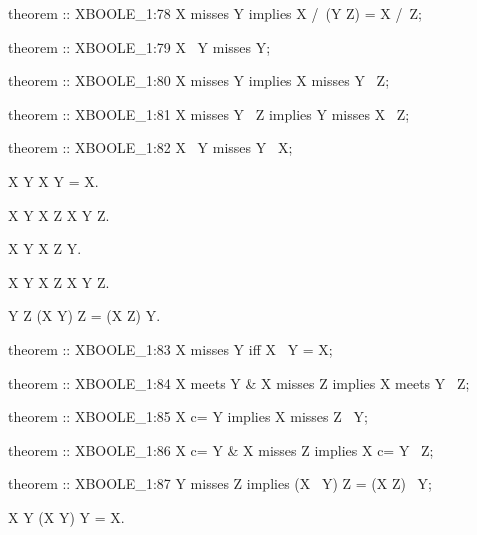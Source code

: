 \begin{paracol}{2}
\switchcolumn

\begin{mizar}
theorem :: XBOOLE_1:78
  X misses Y implies X /\ (Y \/ Z) = X /\ Z;

theorem :: XBOOLE_1:79
  X \ Y misses Y;

theorem :: XBOOLE_1:80
  X misses Y implies X misses Y \ Z;

theorem :: XBOOLE_1:81
  X misses Y \ Z implies Y misses X \ Z;

theorem :: XBOOLE_1:82
  X \ Y misses Y \ X;
\end{mizar}

\switchcolumn*\ensurevspace{5cm}

\begin{theorem}
  X \misses Y \iff X \setminus Y = X.
\end{theorem}

\begin{theorem}
  X \meets Y \land X \misses Z \implies X \meets Y \setminus Z.
\end{theorem}

\begin{theorem}
  X \subset Y \implies X \misses Z \setminus Y.
\end{theorem}

\begin{theorem}
  X \subset Y \land X \misses Z \implies X \subset Y \setminus Z.
\end{theorem}

\begin{theorem}
  Y \misses Z \implies (X \setminus Y) \cup Z = (X \cup Z) \setminus Y.
\end{theorem}

\switchcolumn

\begin{mizar}
theorem :: XBOOLE_1:83
  X misses Y iff X \ Y = X;

theorem :: XBOOLE_1:84
  X meets Y & X misses Z 
  implies X meets Y \ Z;

theorem :: XBOOLE_1:85
  X c= Y implies X misses Z \ Y;

theorem :: XBOOLE_1:86
  X c= Y & X misses Z 
  implies X c= Y \ Z;

theorem :: XBOOLE_1:87
  Y misses Z 
  implies (X \ Y) \/ Z = (X \/ Z) \ Y;
\end{mizar}

\switchcolumn*\ensurevspace{5cm}

\begin{theorem}
  X \misses Y \implies (X \cup Y) \setminus Y = X.
\end{theorem}


\end{paracol}
